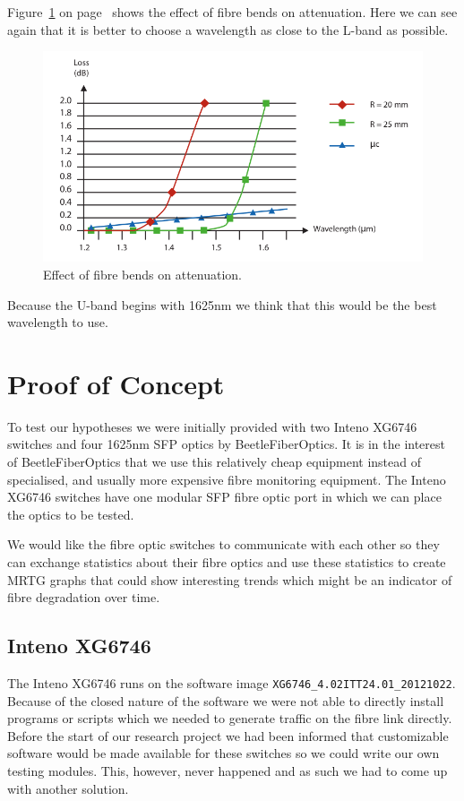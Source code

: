 \documentclass{article}
\begin{document}
Figure~\ref{fig:attenuation-bends} on page~\pageref{fig:attenuation-bends} shows the effect of fibre bends on attenuation. Here we can see again that it is better to choose a wavelength as close to the L-band as possible.
\begin{figure}[h]
\centerline{\includegraphics[scale=0.3, trim = 0mm 0mm 0mm 0mm]{images/attenuation-bends.png}}
\caption{Effect of fibre bends on attenuation.\cite[p. 27]{refguide:2011}}
\label{fig:attenuation-bends}
\end{figure}

Because the U-band begins with 1625nm we think that this would be the best wavelength to use.

\newpage
\section{Proof of Concept}
To test our hypotheses we were initially provided with two Inteno XG6746\cite{Inteno:XG6746} switches and four 1625nm SFP optics by BeetleFiberOptics.
It is in the interest of BeetleFiberOptics that we use this relatively cheap equipment instead of specialised, and usually more expensive fibre monitoring equipment.
The Inteno XG6746 switches have one modular SFP fibre optic port in which we can place the optics to be tested. 

We would like the fibre optic switches to communicate with each other so they can exchange statistics about their fibre optics and use these statistics to create MRTG\cite{MRTG:MRTG} graphs that could show interesting trends which might be an indicator of fibre degradation over time.

\subsection{Inteno XG6746}
The Inteno XG6746 runs on the software image \texttt{XG6746\_4.02ITT24.01\_20121022}.
Because of the closed nature of the software we were not able to directly install programs or scripts which we needed to generate traffic on the fibre link directly.
Before the start of our research project we had been informed that customizable software would be made available for these switches so we could write our own testing modules.
This, however, never happened and as such we had to come up with another solution.
\end{document}

